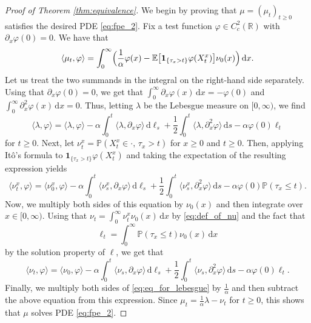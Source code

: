 \documentclass[11pt, a4paper]{article}
\theoremstyle{plain}
\theoremstyle{definition}
\theoremstyle{remark}
\numberwithin{equation}{section}
\newcommand{\ev}{\mathbb{E}}
\newcommand{\pr}{\mathbb{P}}
\newcommand{\R}{\mathbb{R}}
\renewcommand{\d}{\mathrm{d}}
\renewcommand{\bf}[1]{\mathbf{#1}}
\begin{document}
\begin{proof}[Proof of Theorem \ref{thm:equivalence}]
We begin by proving that $\mu = (\mu_t)_{t \geq 0}$ satisfies the desired PDE \eqref{eq:fpe_2}. Fix a test function $\varphi \in C_c^2(\R)$ with $\partial_x \varphi(0) = 0$. We have that
\begin{equation*}
    \langle \mu_t, \varphi\rangle = \int_0^{\infty} \Bigl(\frac{1}{\alpha} \varphi(x) - \ev\bigl[\bf{1}_{\{\tau_x > t\}} \varphi(X^x_t)\bigr] \nu_0(x)\Bigr) \, \d x.
\end{equation*}
Let us treat the two summands in the integral on the right-hand side separately. Using that $\partial_x \varphi(0) = 0$, we get that $\int_0^{\infty} \partial_x \varphi(x) \, \d x = - \varphi(0)$ and $\int_0^{\infty} \partial_x^2 \varphi(x) \, \d x = 0$. Thus, letting $\lambda$ be the Lebesgue measure on $[0, \infty)$, we find
\begin{equation} \label{eq:eq_for_lebesgue}
    \langle \lambda, \varphi\rangle = \langle \lambda, \varphi\rangle - \alpha \int_0^t \langle \lambda, \partial_x \varphi\rangle \, \d \ell_s + \frac{1}{2} \int_0^t \langle \lambda, \partial_x^2 \varphi\rangle \, \d s - \alpha \varphi(0) \ell_t
\end{equation}
for $t \geq 0$. Next, let $\nu_t^x = \pr(X^x_t \in \cdot,\, \tau_x > t)$ for $x \geq 0$ and $t \geq 0$. Then, applying It\^o's formula to $\bf{1}_{\{\tau_x > t\}} \varphi(X^x_t)$ and taking the expectation of the resulting expression yields
\begin{equation*}
    \langle \nu^x_t, \varphi\rangle = \langle \nu^x_0, \varphi\rangle - \alpha \int_0^t \langle \nu^x_s, \partial_x \varphi\rangle \, \d \ell_s + \frac{1}{2} \int_0^t \langle \nu^x_s, \partial_x^2 \varphi\rangle \, \d s - \alpha \varphi(0) \pr(\tau_x \leq t).
\end{equation*}
Now, we multiply both sides of this equation by $\nu_0(x)$ and then integrate over $x \in [0, \infty)$. Using that $\nu_t = \int_0^{\infty} \nu^x_t \nu_0(x) \, \d x$ by \eqref{eq:def_of_nu} and the fact that
\begin{equation*}
    \ell_t = \int_0^{\infty} \pr(\tau_x \leq t) \nu_0(x) \, \d x
\end{equation*}
by the solution property of $\ell$, we get that
\begin{equation*}
    \langle \nu_t, \varphi\rangle = \langle \nu_0, \varphi\rangle - \alpha \int_0^t \langle \nu_s, \partial_x \varphi\rangle \, \d \ell_s + \frac{1}{2} \int_0^t \langle \nu_s, \partial_x^2 \varphi\rangle \, \d s - \alpha \varphi(0) \ell_t.
\end{equation*}
Finally, we multiply both sides of \eqref{eq:eq_for_lebesgue} by $\frac{1}{\alpha}$ and then subtract the above equation from this expression. Since $\mu_t = \frac{1}{\alpha} \lambda - \nu_t$ for $t \geq 0$, this shows that $\mu$ solves PDE \eqref{eq:fpe_2}.


\end{proof}
\end{document}

